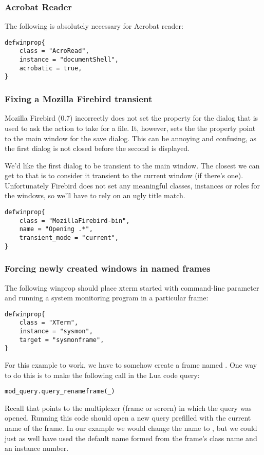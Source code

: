 \subsubsection{Acrobat Reader}

The following is absolutely necessary for Acrobat reader:

\begin{verbatim}
defwinprop{
    class = "AcroRead",
    instance = "documentShell",
    acrobatic = true,
}
\end{verbatim}

\subsubsection{Fixing a Mozilla Firebird transient}

Mozilla Firebird (0.7) incorrectly does not set the  
property for the dialog that is used to ask the action to take for a file.
It, however, sets the the property point to the main window for the save
dialog. This can be annoying and confusing, as the first dialog is not 
closed before the second is displayed.

We'd like the first dialog to be transient to the main window. The closest
we can get to that is to consider it transient to the current window (if
there's one). Unfortunately Firebird does not set any meaningful classes, 
instances or roles for the windows, so we'll have to rely on an ugly title
match.

\begin{verbatim}
defwinprop{
    class = "MozillaFirebird-bin",
    name = "Opening .*",
    transient_mode = "current",
}
\end{verbatim}

\subsubsection{Forcing newly created windows in named frames}

The following winprop should place xterm started with command-line parameter
\mbox{} and running a system monitoring program in a
particular frame:
\begin{verbatim}
defwinprop{
    class = "XTerm",
    instance = "sysmon",
    target = "sysmonframe",
}
\end{verbatim}

For this example to work, we have to somehow create a frame named
. One way to do this is to make the following
call in the  Lua code query:

\begin{verbatim}
mod_query.query_renameframe(_)
\end{verbatim}

Recall that \code{_} points to the multiplexer (frame or screen) in which 
the query was opened. Running this code should open a new query prefilled
with the current name of the frame. In our example we would change the 
name to , but we could just as well have used the 
default name formed from the frame's class name and an instance number.
